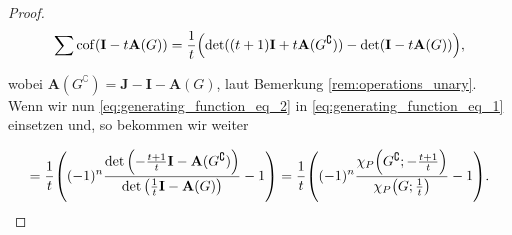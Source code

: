 \begin{proof}
            \begin{align} \label{eq:generating_function_eq_2}
                \sum \operatorname{cof}(\mathbf I - t \mathbf A(G))
                =
                \frac{1}{t}
                {\left ( 
                    \det((t+1) \mathbf I + t \mathbf A(G^\complement))
                    -
                    \det(\mathbf I - t \mathbf A(G))
                 \right )},
            \end{align}

            wobei $\mathbf A(G^\complement) = \mathbf J - \mathbf I - \mathbf A(G)$, laut Bemerkung \ref{rem:operations_unary}.
            Wenn wir nun \eqref{eq:generating_function_eq_2} in \eqref{eq:generating_function_eq_1} einsetzen und, so bekommen wir weiter

            \begin{align*}
                =
                \frac{1}{t}
                {\left ( 
                    (-1)^n
                    \frac
                    {
                        \det
                        {\left ( 
                            -\frac{t+1}{t} \mathbf I - \mathbf A(G^\complement)
                         \right )}
                    }{
                        \det
                        {\left ( 
                            \frac{1}{t} \mathbf I - \mathbf A(G)
                         \right )}
                    }
                    -
                    1
                 \right )}
                =
                \frac{1}{t}
                {\left ( 
                    (-1)^n
                    \frac
                    {
                        \chi_P
                        {\left ( 
                            G^\complement;
                            -\frac{t+1}{t}
                         \right )}
                    }{
                        \chi_P
                        {\left ( 
                            G;
                            \frac{1}{t}
                         \right )}
                    }
                    -
                    1
                 \right )}.
            \end{align*}

        \end{proof}
